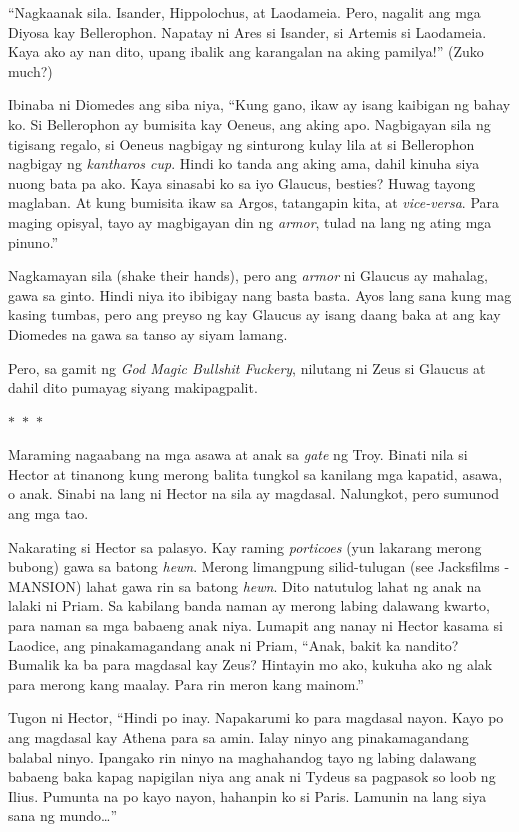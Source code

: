 \documentclass[12pt,letterpaper]{report}
\newcommand{\seperate}{\begin{center}$\ast$~$\ast$~$\ast$\end{center}}
\begin{document}
``Nagkaanak sila. Isander, Hippolochus, at Laodameia. Pero, nagalit ang mga Diyosa kay Bellerophon. Napatay ni Ares si Isander, si Artemis si Laodameia. Kaya ako ay nan dito, upang ibalik ang karangalan na aking pamilya!'' (Zuko much?)

Ibinaba ni Diomedes ang siba niya, ``Kung gano, ikaw ay isang kaibigan ng bahay ko. Si Bellerophon ay bumisita kay Oeneus, ang aking apo. Nagbigayan sila ng tigisang regalo, si Oeneus nagbigay ng sinturong kulay lila at si Bellerophon nagbigay ng \textit{kantharos cup}. Hindi ko tanda ang aking ama, dahil kinuha siya nuong bata pa ako. Kaya sinasabi ko sa iyo Glaucus, besties? Huwag tayong maglaban. At kung bumisita ikaw sa Argos, tatangapin kita, at \textit{vice-versa}. Para maging opisyal, tayo ay magbigayan din ng \textit{armor}, tulad na lang ng ating mga pinuno.''

Nagkamayan sila (shake their hands), pero ang \textit{armor} ni Glaucus ay mahalag, gawa sa ginto. Hindi niya ito ibibigay nang basta basta. Ayos lang sana kung mag kasing tumbas, pero ang preyso ng kay Glaucus ay isang daang baka at ang kay Diomedes na gawa sa tanso ay siyam lamang.

Pero, sa gamit ng \textit{God Magic Bullshit Fuckery}, nilutang ni Zeus si Glaucus at dahil dito pumayag siyang makipagpalit.

\seperate

Maraming nagaabang na mga asawa at anak sa \textit{gate} ng Troy. Binati nila si Hector at tinanong kung merong balita tungkol sa kanilang mga kapatid, asawa, o anak. Sinabi na lang ni Hector na sila ay magdasal. Nalungkot, pero sumunod ang mga tao.

Nakarating si Hector sa palasyo. Kay raming \textit{porticoes} (yun lakarang merong bubong) gawa sa batong \textit{hewn}. Merong limangpung silid-tulugan (see Jacksfilms - MANSION) lahat gawa rin sa batong \textit{hewn}. Dito natutulog lahat ng anak na lalaki ni Priam. Sa kabilang banda naman ay merong labing dalawang kwarto, para naman sa mga babaeng anak niya. Lumapit ang nanay ni Hector kasama si Laodice, ang pinakamagandang anak ni Priam, ``Anak, bakit ka nandito? Bumalik ka ba para magdasal kay Zeus? Hintayin mo ako, kukuha ako ng alak para merong kang maalay. Para rin meron kang mainom.''

Tugon ni Hector, ``Hindi po inay. Napakarumi ko para magdasal nayon. Kayo po ang magdasal kay Athena para sa amin. Ialay ninyo ang pinakamagandang balabal ninyo. Ipangako rin ninyo na maghahandog tayo ng labing dalawang babaeng baka kapag napigilan niya ang anak ni Tydeus sa pagpasok so loob ng Ilius. Pumunta na po kayo nayon, hahanpin ko si Paris. Lamunin na lang siya sana ng mundo\dots''
\end{document}
